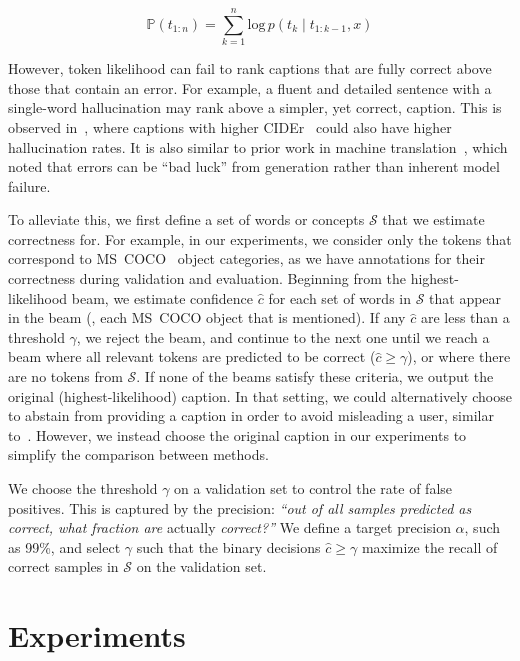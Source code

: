 \documentclass[10pt,twocolumn,letterpaper]{article}
\begin{document}
\begin{equation}
\mathbb{P}(t_{1:n}) = \sum_{k=1}^{n} \text{log}\, p(t_k \mid t_{1:k-1}, x)
    \label{eq:beam-ranks}
\end{equation}


However, token likelihood can fail to rank captions that are fully correct above those that contain an error. For example, a fluent and detailed sentence with a single-word hallucination may rank above a simpler, yet correct, caption. This is observed in~\cite{rohrbach2018emnlp}, where captions with higher CIDEr~\cite{vedantam2015cider} could also have higher hallucination rates. It is also similar to prior work in machine translation~\cite{guerreiro2022looking}, which noted that errors can be ``bad luck'' from generation rather than inherent model failure.

To alleviate this, we first define a set of words or concepts $\mathcal{S}$ that we estimate correctness for. For example, in our experiments, we consider only the tokens that correspond to MS~COCO~\cite{chen2015microsoft} object categories, as we have annotations for their correctness during validation and evaluation. Beginning from the highest-likelihood beam, we estimate confidence $\hat c$ for each set of words in $\mathcal{S}$ that appear in the beam (\eg, each MS~COCO object that is mentioned). If any $\hat c$ are less than a threshold $\gamma$, we reject the beam, and continue to the next one until we reach a beam where all relevant tokens are predicted to be correct ($\hat c \geq \gamma$), or where there are no tokens from $\mathcal{S}$. If none of the beams satisfy these criteria, we output the original (highest-likelihood) caption. In that setting, we could alternatively choose to abstain from providing a caption in order to avoid misleading a user, similar to~\cite{whitehead2022reliable}. However, we instead choose the original caption in our experiments to simplify the comparison between methods.


We choose the threshold $\gamma$ on a validation set to control the rate of false positives. This is captured by the precision: \textit{``out of all samples predicted as correct, what fraction are} actually \textit{correct?''} We define a target precision $\alpha$, such as 99\%, and select $\gamma$ such that the binary decisions $\hat c \geq \gamma$ maximize the recall of correct samples in $\mathcal{S}$ on the validation set.


\section{Experiments}
\label{sec:experiments}
\end{document}
